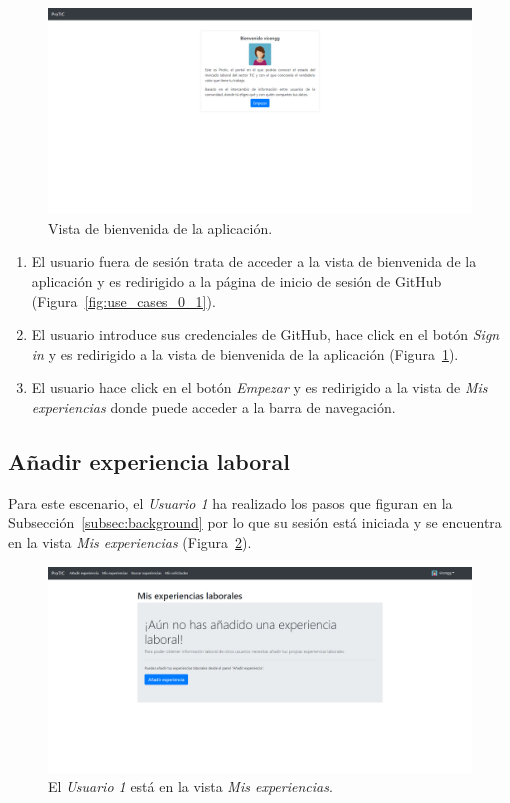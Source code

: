 \documentclass[a4paper, 12pt]{book}
\begin{document}
    \begin{figure}
        \centering
        \includegraphics[width=15cm, keepaspectratio]{img/0.2.png}
        \caption{Vista de bienvenida de la aplicación.}\label{fig:use_cases_0_2}
    \end{figure}

    \begin{enumerate}
        \item El usuario fuera de sesión trata de acceder a la vista de bienvenida de la aplicación y es redirigido a la página de inicio de
        sesión de GitHub (Figura~\ref{fig:use_cases_0_1}).
        \item El usuario introduce sus credenciales de GitHub, hace click en el botón \emph{Sign in}
        y es redirigido a la vista de bienvenida de la aplicación (Figura~\ref{fig:use_cases_0_2}).
        \item El usuario hace click en el botón \emph{Empezar}
        y es redirigido a la vista de \emph{Mis experiencias} donde puede acceder a la barra de navegación.
    \end{enumerate}

    \subsection{Añadir experiencia laboral}
    \label{subsec:add_work_experience}
    Para este escenario, el \emph{Usuario 1} ha realizado los pasos que figuran en la Subsección~\ref{subsec:background}
    por lo que su sesión está iniciada y se encuentra en la vista \emph{Mis experiencias} (Figura~\ref{fig:use_cases_1_1}).

    \begin{figure}
        \centering
        \includegraphics[width=15cm, keepaspectratio]{img/1.1.png}
        \caption{El \emph{Usuario 1} está en la vista \emph{Mis experiencias}.}
        \label{fig:use_cases_1_1}
    \end{figure}
\end{document}
